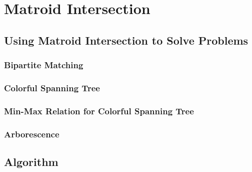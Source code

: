 \chapter{Matroid Intersection}
\section{Using Matroid Intersection to Solve Problems}
\subsection{Bipartite Matching}
\subsection{Colorful Spanning Tree}
\subsection{Min-Max Relation for Colorful Spanning Tree}
\subsection{Arborescence}
\section{Algorithm}